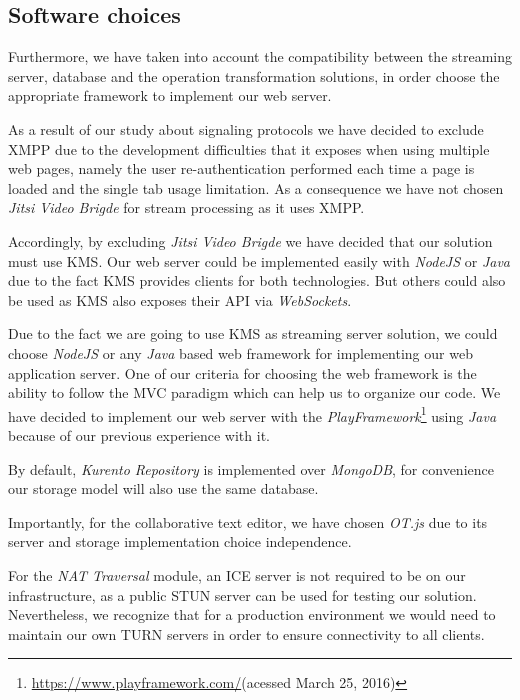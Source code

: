 \subsection{Software choices}

Furthermore, we have taken into account the compatibility between the streaming server, database and the operation transformation solutions, in order choose the appropriate framework to implement our web server.

As a result of our study about signaling protocols we have decided to exclude \ac{XMPP} due to the development difficulties that it exposes when using multiple web pages, namely the user re-authentication performed each time a page is loaded and the single tab usage limitation. As a consequence we have not chosen \emph{Jitsi Video Brigde} for stream processing as it uses \ac{XMPP}.

Accordingly, by excluding \emph{Jitsi Video Brigde} we have decided that our solution must use \ac{KMS}. Our web server could be implemented easily with \emph{NodeJS} or \emph{Java} due to the fact \ac{KMS} provides clients for both technologies. But others could also be used as \ac{KMS} also exposes their \ac{API} via \emph{WebSockets}.

Due to the fact we are going to use \ac{KMS} as streaming server solution, we could choose \emph{NodeJS} or any \emph{Java} based web framework for implementing our web application server. One of our criteria for choosing the web framework is the ability to follow the \ac{MVC} paradigm which can help us to organize our code. We have decided to implement our web server with the \emph{PlayFramework}\footnote{\url{https://www.playframework.com/}(acessed March 25, 2016)} using \emph{Java} because of our previous experience with it.

By default, \emph{Kurento Repository} is implemented over \emph{MongoDB}, for convenience our storage model will also use the same database.

Importantly, for the collaborative text editor, we have chosen \emph{OT.js} due to its server and storage implementation choice independence.

For the \emph{NAT Traversal} module, an \ac{ICE} server is not required to be on our infrastructure, as a public \ac{STUN} server can be used for testing our solution. Nevertheless, we recognize that for a production environment we would need to maintain our own \ac{TURN} servers in order to ensure connectivity to all clients.

